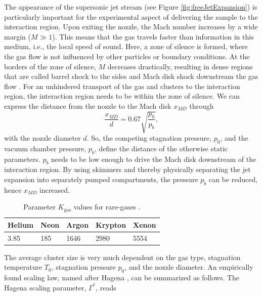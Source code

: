 %
The appearance of the supersonic jet stream (see Figure \ref{fig:freeJetExpansion}) is particularly important for the experimental aspect of delivering the sample to the interaction region. Upon exiting the nozzle, the Mach number increases by a wide margin ($M\gg 1$). This means that the gas travels faster than information in this medium, i.e., the local speed of sound. Here, a zone of silence is formed, where the gas flow is not influenced by other particles or boundary conditions.
At the borders of the zone of silence, $M$ decreases drastically, resulting in dense regions that are called barrel shock to the sides and Mach disk shock downstream the gas flow \citep{Miller-1988-Oxford}. For an unhindered transport of the gas and clusters to the interaction region, the interaction region needs to be within the zone of silence. We can express the distance from the nozzle to the Mach disk $x_{MD}$ through
\begin{equation}
\frac{x_{MD}}{d}=0.67\sqrt{\frac{p_{0}}{p_{b}}},
\label{eq:distance-of-mach-disk}
\end{equation}
with the nozzle diameter $d$. So, the competing stagnation pressure, $p_{0}$, and the vacuum chamber pressure, $p_{b}$, define the distance of the otherwise static parameters. $p_{b}$ needs to be low enough to drive the Mach disk downstream of the interaction region. By using skimmers and thereby physically separating the jet expansion into separately pumped compartments, the pressure $p_{b}$ can be reduced, hence $x_{MD}$ increased.\\[1\baselineskip]
%
\begin{table}
	\centering
		\begin{tabular}{ | l | l | l | l | l | }
			\hline
			Helium & Neon & Argon & Krypton & Xenon \\ \hline
			3.85 & 185 & 1646 & 2980 & 5554 \\ \hline
		\end{tabular}
	\caption[Parameter $K_{\text{gas}}$ values for rare-gases.]{Parameter $K_{\text{gas}}$ values for rare-gases \cite{Woermer-1991-CPL}.}
	\label{tab:k-parameter}
\end{table}
The average cluster size is very much dependent on the gas type, stagnation temperature $T_{0}$, stagnation pressure $p_{0}$, and the nozzle diameter. An empirically found scaling law, named after Hagena \citep{Hagena-1972-JCP,Hagena-1981-SurfSci,Hagena-1987-ZeitschriftAMC}, can be summarized as follows. The Hagena scaling parameter, $\Gamma^{*}$, reads
